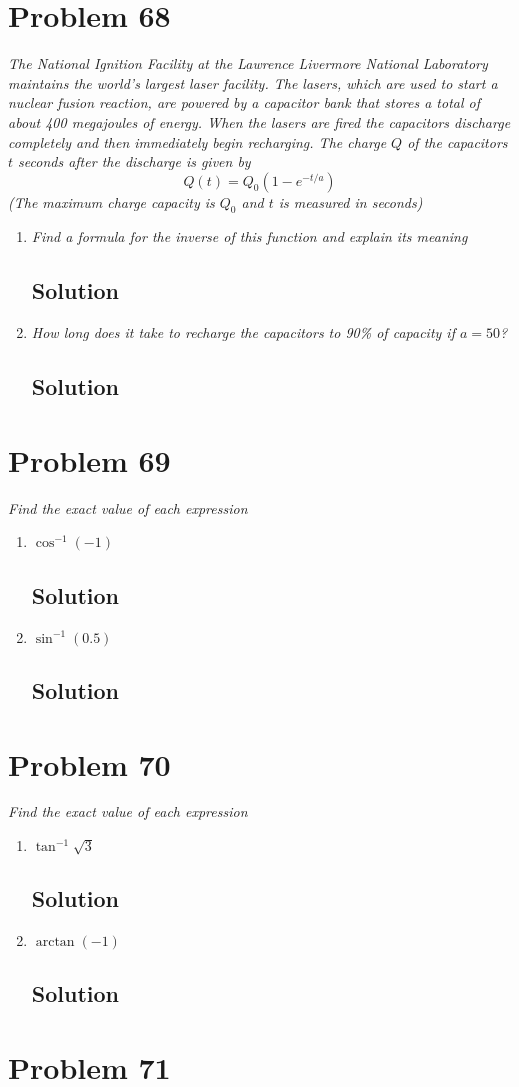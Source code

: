 \documentclass[11pt]{article}
\newcommand{\soln}{\subsection*}
\newcommand{\qn}{\textit}
\begin{document}
\section*{Problem 68}

\qn{The National Ignition Facility at the Lawrence Livermore National Laboratory maintains the world's largest laser facility. The lasers, which are used to start a nuclear fusion reaction, are powered by a capacitor bank that stores a total of about 400 megajoules of energy. When the lasers are fired the capacitors discharge completely and then immediately begin recharging. The charge $Q$ of the capacitors $t$ seconds after the discharge is given by $$Q(t)=Q_0(1-e^{-t/a})$$ (The maximum charge capacity is $Q_0$ and $t$ is measured in seconds)}
\begin{enumerate}
	\item \qn{Find a formula for the inverse of this function and explain its meaning}
	\soln{Solution}
	
	\item \qn{How long does it take to recharge the capacitors to 90\% of capacity if $a=50$?}
	\soln{Solution}
\end{enumerate}

\section*{Problem 69}

\qn{Find the exact value of each expression}
\begin{enumerate}
	\item \qn{$\cos^{-1}(-1)$}
	\soln{Solution}
	
	\item \qn{$\sin^{-1}(0.5)$}
	\soln{Solution}
\end{enumerate}

\section*{Problem 70}

\qn{Find the exact value of each expression}
\begin{enumerate}
	\item \qn{$\tan^{-1}\sqrt{3}$}
	\soln{Solution}
	
	\item \qn{$\arctan(-1)$}
	\soln{Solution}
\end{enumerate}

\section*{Problem 71}
\end{document}
